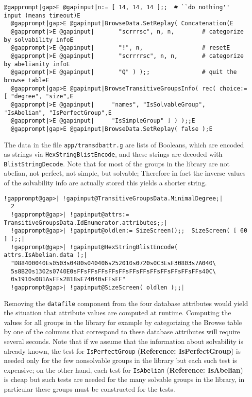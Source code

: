 \documentclass[a4paper,11pt]{report}
\begin{document}
{{{ 
\begin{Verbatim}[commandchars=@|E,fontsize=\small,frame=single,label=Example]
  @gapprompt|gap>E @gapinput|n:= [ 14, 14, 14 ];;  # ``do nothing'' input (means timeout)E
  @gapprompt|gap>E @gapinput|BrowseData.SetReplay( Concatenation(E
  @gapprompt|>E @gapinput|       "scrrrsc", n, n,        # categorize by solvability infoE
  @gapprompt|>E @gapinput|       "!", n,                 # resetE
  @gapprompt|>E @gapinput|       "scrrrrsc", n, n,       # categorize by abelianity infoE
  @gapprompt|>E @gapinput|       "Q" ) );;               # quit the browse tableE
  @gapprompt|gap>E @gapinput|BrowseTransitiveGroupsInfo( rec( choice:= [ "degree", "size",E
  @gapprompt|>E @gapinput|     "names", "IsSolvableGroup", "IsAbelian", "IsPerfectGroup",E
  @gapprompt|>E @gapinput|     "IsSimpleGroup" ] ) );;E
  @gapprompt|gap>E @gapinput|BrowseData.SetReplay( false );E
\end{Verbatim}
 

 The data in the file \texttt{app/transdbattr.g} are lists of Booleans, which are encoded as strings via \texttt{HexStringBlistEncode}, and these strings are decoded with \texttt{BlistStringDecode}. Note that for most of the groups in the library are not abelian, not
perfect, not simple, but solvable; Therefore in fact the inverse values of the
solvability info are actually stored {\textendash}this yields a shorter
string. 

 
\begin{Verbatim}[commandchars=!@|,fontsize=\small,frame=single,label=Example]
  !gapprompt@gap>| !gapinput@TransitiveGroupsData.MinimalDegree;|
  2
  !gapprompt@gap>| !gapinput@attrs:= TransitiveGroupsData.IdEnumerator.attributes;;|
  !gapprompt@gap>| !gapinput@oldlen:= SizeScreen();;  SizeScreen( [ 60 ] );;|
  !gapprompt@gap>| !gapinput@HexStringBlistEncode( attrs.IsAbelian.data );|
  "D88400040Es0503s0480s040406s252010s0720s0C3EsF30803s7A040\
  5s8B20s1302s0740E0sFFsFFsFFsFFsFFsFFsFFsFFsFFsFFsFFsFFs40C\
  0s1910s0B1AsFFs2B18sE74040sFFsFF"
  !gapprompt@gap>| !gapinput@SizeScreen( oldlen );;|
\end{Verbatim}
 

 Removing the \texttt{datafile} component from the four database attributes would yield the situation that
attribute values are computed at runtime. Computing the values for all groups
in the library {\textendash}for example by categorizing the Browse table by
one of the columns that correspond to these database attributes{\textendash}
will require several seconds. Note that if we assume that the information
about solvability is already known, the test for \texttt{IsPerfectGroup} (\textbf{Reference: IsPerfectGroup}) is needed only for the few nonsolvable groups in the library but each such
test is expensive; on the other hand, each test for \texttt{IsAbelian} (\textbf{Reference: IsAbelian}) is cheap but such tests are needed for the many solvable groups in the
library, in particular these groups must be constructed for the tests. }

 }

 }
\end{document}
